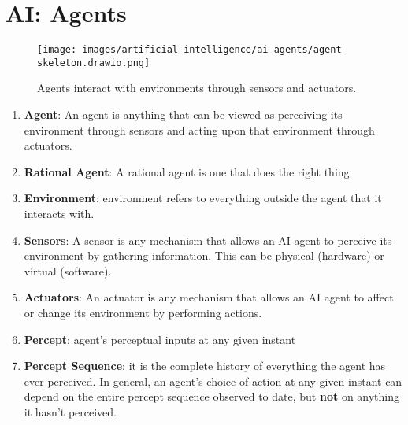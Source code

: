 \chapter{AI: Agents}\label{AI: Agents}

\begin{figure}[H]
    \centering
    \texttt{[image: images/artificial-intelligence/ai-agents/agent-skeleton.drawio.png]}
    \caption*{Agents interact with environments through sensors and actuators. \cite{common/online/draw.io}}
\end{figure}


\begin{enumerate}[itemsep=0.2cm]
    \item \textbf{Agent}: An agent is anything that can be viewed as perceiving its environment through sensors and acting upon that environment through actuators.
    \hfill \cite{ai/book/Artificial-Intelligence-A-Modern-Approach/Russell-Norvig}

    \item \textbf{Rational Agent}: A rational agent is one that does the right thing
    \hfill \cite{ai/book/Artificial-Intelligence-A-Modern-Approach/Russell-Norvig}
    

    \item \textbf{Environment}: environment refers to everything outside the agent that it interacts with.
    \hfill \cite{common/online/chatgpt}

    \item \textbf{Sensors}: A sensor is any mechanism that allows an AI agent to perceive its environment by gathering information. This can be physical (hardware) or virtual (software).
    \hfill \cite{common/online/chatgpt}

    \item \textbf{Actuators}: An actuator is any mechanism that allows an AI agent to affect or change its environment by performing actions.
    \hfill \cite{common/online/chatgpt}

    \item \textbf{Percept}: agent’s perceptual inputs at any given instant
    \hfill \cite{ai/book/Artificial-Intelligence-A-Modern-Approach/Russell-Norvig}
    
    \item \textbf{Percept Sequence}: it is the complete history of everything the agent has ever perceived. In general, an agent’s choice of action at any given instant can depend on the entire percept sequence observed to date, but \textbf{not} on anything it hasn’t perceived.
    \hfill \cite{ai/book/Artificial-Intelligence-A-Modern-Approach/Russell-Norvig}


\end{enumerate}
